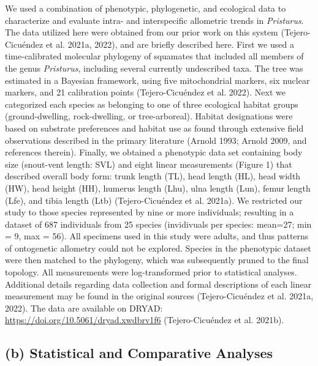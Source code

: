 \documentclass[
  11pt,
]{article}
\begin{document}
We used a combination of phenotypic, phylogenetic, and ecological data
to characterize and evaluate intra- and interspecific allometric trends
in \emph{Pristurus}. The data utilized here were obtained from our prior
work on this system (Tejero-Cicuéndez et al. 2021a, 2022), and are
briefly described here. First we used a time-calibrated molecular
phylogeny of squamates that included all members of the genus
\emph{Pristurus}, including several currently undescribed taxa. The tree
was estimated in a Bayesian framework, using five mitochondrial markers,
six nuclear markers, and 21 calibration points (Tejero-Cicuéndez et al.
2022). Next we categorized each species as belonging to one of three
ecological habitat groups (ground-dwelling, rock-dwelling, or
tree-arboreal). Habitat designations were based on substrate preferences
and habitat use as found through extensive field observations described
in the primary literature (Arnold 1993; Arnold 2009, and references
therein). Finally, we obtained a phenotypic data set containing body
size (snout-vent length: SVL) and eight linear measurements (Figure 1)
that described overall body form: trunk length (TL), head length (HL),
head width (HW), head height (HH), humerus length (Lhu), ulna length
(Lun), femur length (Lfe), and tibia length (Ltb) (Tejero-Cicuéndez et
al. 2021a). We restricted our study to those species represented by nine
or more individuals; resulting in a dataset of 687 individuals from 25
species (invidivuals per species: mean=27; min = 9, max = 56). All
specimens used in this study were adults, and thus patterns of
ontogenetic allometry could not be explored. Species in the phenotypic
dataset were then matched to the phylogeny, which was subsequently
pruned to the final topology. All measurements were log-transformed
prior to statistical analyses. Additional details regarding data
collection and formal descriptions of each linear measurement may be
found in the original sources (Tejero-Cicuéndez et al. 2021a, 2022). The
data are available on DRYAD:
\url{https://doi.org/10.5061/dryad.xwdbrv1f6} (Tejero-Cicuéndez et al.
2021b).

\hypertarget{b-statistical-and-comparative-analyses}{%
\subsection{(b) Statistical and Comparative
Analyses}\label{b-statistical-and-comparative-analyses}}
\end{document}
